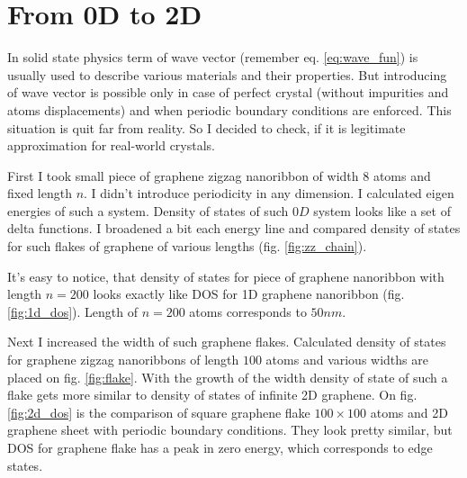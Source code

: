 \chapter{From 0D to 2D}
In solid state physics term of wave vector (remember eq. \ref{eq:wave_fun}) is usually used to describe various materials and their properties. But introducing of wave vector is possible only in case of perfect crystal (without impurities and atoms displacements) and when periodic boundary conditions are enforced. This situation is quit far from reality. So I decided to check, if it is legitimate approximation for real-world crystals.

First I took small piece of graphene zigzag nanoribbon of width $8$ atoms and fixed length $n$. I didn't introduce periodicity in any dimension. I calculated eigen energies of such a system. Density of states of such $0D$ system looks like a set of delta functions. I broadened a bit each energy line and compared density of states for such flakes of graphene of various lengths (fig. \ref{fig:zz_chain}).

It's easy to notice, that density of states for piece of graphene nanoribbon with length $n=200$ looks exactly like DOS for 1D graphene nanoribbon (fig. \ref{fig:1d_dos}). Length of $n=200$ atoms corresponds to $50 nm$.

Next I increased the width of such graphene flakes. Calculated density of states for graphene zigzag nanoribbons of length $100$ atoms and various widths are placed on fig. \ref{fig:flake}. With the growth of the width density of state of such a flake gets more similar to density of states of infinite 2D graphene. On fig. \ref{fig:2d_dos} is the comparison of square graphene flake $100 \times 100$ atoms and 2D graphene sheet with periodic boundary conditions. They look pretty similar, but DOS for graphene flake has a peak in zero energy, which corresponds to edge states.

